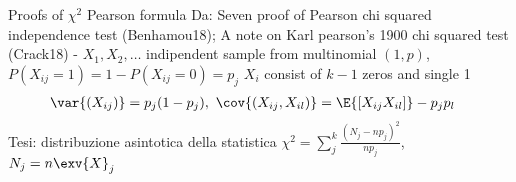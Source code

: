 \begin{frame}[allowframebreaks]{Proofs of $\chi^2$ Pearson formula}
Da: Seven proof of Pearson chi squared independence test (Benhamou18); A note on Karl pearson's 1900 chi squared test (Crack18)
 - $X_1,X_2,\ldots$ indipendent sample from multinomial $(1,p)$, $P(X_{ij}=1)=1-P(X_{ij}=0)=p_j$ $X_i$ consist of $k-1$ zeros and single 1
\begin{align*}
&\var{(X_{ij})}=p_j(1-p_j),\ \cov{(X_{ij},X_{il})}=\E{[X_{ij}X_{il}]}-p_jp_l
\end{align*}
Tesi: distribuzione asintotica della statistica $\chi^2=\sum_j^k\frac{(N_j-np_j)^2}{np_j}$, $N_j=n\exv{X}_j$
\end{frame}
